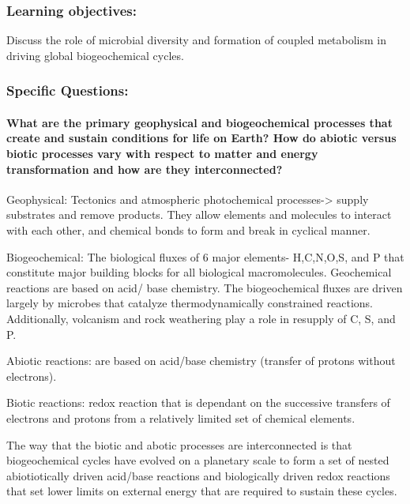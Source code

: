 \documentclass[]{article}
\let\oldparagraph\paragraph
\renewcommand{\paragraph}[1]{\oldparagraph{#1}\mbox{}}
\begin{document}
\subsubsection{Learning objectives:}\label{learning-objectives-3}

Discuss the role of microbial diversity and formation of coupled
metabolism in driving global biogeochemical cycles.

\subsubsection{Specific Questions:}\label{specific-questions-2}

\paragraph{What are the primary geophysical and biogeochemical processes
that create and sustain conditions for life on Earth? How do abiotic
versus biotic processes vary with respect to matter and energy
transformation and how are they
interconnected?}\label{what-are-the-primary-geophysical-and-biogeochemical-processes-that-create-and-sustain-conditions-for-life-on-earth-how-do-abiotic-versus-biotic-processes-vary-with-respect-to-matter-and-energy-transformation-and-how-are-they-interconnected}

Geophysical: Tectonics and atmospheric photochemical
processes-\textgreater{} supply substrates and remove products. They
allow elements and molecules to interact with each other, and chemical
bonds to form and break in cyclical manner.

Biogeochemical: The biological fluxes of 6 major elements- H,C,N,O,S,
and P that constitute major building blocks for all biological
macromolecules. Geochemical reactions are based on acid/ base chemistry.
The biogeochemical fluxes are driven largely by microbes that catalyze
thermodynamically constrained reactions. Additionally, volcanism and
rock weathering play a role in resupply of C, S, and P.

Abiotic reactions: are based on acid/base chemistry (transfer of protons
without electrons).

Biotic reactions: redox reaction that is dependant on the successive
transfers of electrons and protons from a relatively limited set of
chemical elements.

The way that the biotic and abotic processes are interconnected is that
biogeochemical cycles have evolved on a planetary scale to form a set of
nested abiotiotically driven acid/base reactions and biologically driven
redox reactions that set lower limits on external energy that are
required to sustain these cycles.
\end{document}
